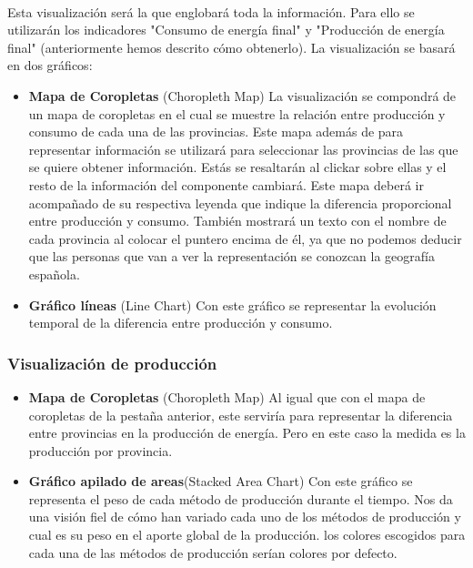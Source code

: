 \documentclass{article}
\begin{document}
				\paragraph{}
				Esta visualización será la que englobará toda la información. Para ello se utilizarán los indicadores "Consumo de energía final" y "Producción de energía final" (anteriormente hemos descrito cómo obtenerlo). La visualización se basará en dos gráficos:
				
				\begin{itemize}
				
					\item  {\bf Mapa de Coropletas} (Choropleth Map) La visualización se compondrá de un mapa de coropletas en el cual se muestre la relación entre producción y consumo de cada una de las provincias. Este mapa además de para representar información se utilizará para seleccionar las provincias de las que se quiere obtener información. Estás se resaltarán al clickar sobre ellas y el resto de la información del componente cambiará. Este mapa deberá ir acompañado de su respectiva leyenda que indique la diferencia proporcional entre producción y consumo. También mostrará un texto con el nombre de cada provincia al colocar el puntero encima de él, ya que no podemos deducir que las personas que van a ver la representación se conozcan la geografía española.
					
					\item  {\bf Gráfico líneas} (Line Chart) Con este gráfico se representar la evolución temporal de la  diferencia entre producción y consumo.
					
				\end{itemize}

			\subsubsection{Visualización de producción}

				\begin{itemize}
				
					\item  {\bf Mapa de Coropletas} (Choropleth Map) Al igual que con el mapa de coropletas de la pestaña anterior, este serviría para representar la diferencia entre provincias en la producción de energía. Pero en este caso la medida es la producción por provincia.
					
					\item  {\bf Gráfico apilado de areas}(Stacked Area Chart) Con este gráfico se representa el peso de cada método de producción durante el tiempo. Nos da una visión fiel de cómo han variado cada uno de los métodos de producción y cual es su peso en el aporte global de la producción. los colores escogidos para cada una de las métodos de producción serían colores por defecto.
					
				\end{itemize}
\end{document}

